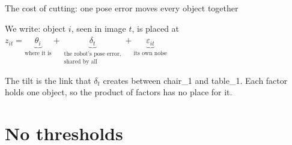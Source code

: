 \documentclass[10pt, aspectratio=169]{beamer}
\begin{document}
\begin{frame}{The cost of cutting: one pose error moves every object together}
  \vspace{0.3em}
  {\small We write: object $i$, seen in image $t$, is placed at\quad
  $z_{it} = \underbrace{\theta_i}_{\text{where it is}} + \underbrace{\delta_t}_{\substack{\text{the robot's pose error,}\\\text{shared by all}}} + \underbrace{\varepsilon_{it}}_{\text{its own noise}}$\par}
  \vspace{0.2em}
  {\scriptsize The tilt is the link that $\delta_t$ creates between chair\_1 and table\_1. Each factor holds one object, so the product of factors has no place for it.\par}
\end{frame}

\section{No thresholds}
\end{document}
